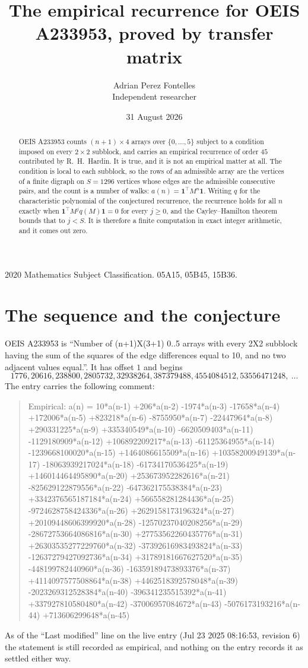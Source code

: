 \documentclass[11pt,a4paper]{article}
\title{The empirical recurrence for OEIS A233953, proved by transfer matrix}
\author{Adrian Perez Fontelles\\ \small Independent researcher}
\date{31 August 2026}
\theoremstyle{plain}
\theoremstyle{definition}
\begin{document}
\maketitle

\begin{abstract}
OEIS A233953 counts $(n+1)\times4$ arrays over $\{0,\dots,5\}$ subject to a condition imposed on
every $2\times2$ subblock, and carries an empirical recurrence of order $45$ contributed
by R.~H.~Hardin. It is true, and it is not an empirical matter at all. The condition is local
to each subblock, so the rows of an admissible array are the vertices of a finite digraph
on $S=1296$ vertices whose edges are the admissible consecutive pairs, and the count is a
number of walks: $a(n)=\mathbf{1}^{\!\top}M^{n}\mathbf{1}$. Writing $q$
for the characteristic polynomial of the conjectured recurrence, the recurrence holds for all
$n$ exactly when $\mathbf{1}^{\!\top}M^{j}q(M)\mathbf{1}=0$ for every $j\ge0$, and the
Cayley--Hamilton theorem bounds that to $j<S$. It is therefore a finite computation in exact
integer arithmetic, and it comes out zero.
\end{abstract}

\noindent\small 2020 Mathematics Subject Classification. 05A15, 05B45, 15B36.\normalsize

\section{The sequence and the conjecture}

OEIS A233953 is ``Number of (n+1)X(3+1) 0..5 arrays with every 2X2 subblock having the sum of the squares of the edge differences equal to 10, and no two adjacent values equal.''. It has offset $1$ and begins
\[
1776, 20616, 238800, 2805732, 32938264, 387379488, 4554084512, 53556471248,\ \dots
\]
The entry carries the following comment:
\begin{quote}\small
Empirical: a(n) = 10*a(n-1) +206*a(n-2) -1974*a(n-3) -17658*a(n-4) +172006*a(n-5) +823218*a(n-6) -8755950*a(n-7) -22447964*a(n-8) +290331225*a(n-9) +335340549*a(n-10) -6620509403*a(n-11) -1129180909*a(n-12) +106892209217*a(n-13) -61125364955*a(n-14) -1239668100020*a(n-15) +1464086615509*a(n-16) +10358200949139*a(n-17) -18063939217024*a(n-18) -61734170536425*a(n-19) +146014464495890*a(n-20) +253673952282616*a(n-21) -825629122879556*a(n-22) -647362175538384*a(n-23) +3342376565187184*a(n-24) +566558281284436*a(n-25) -9724628758424336*a(n-26) +2629158173196324*a(n-27) +20109448606399920*a(n-28) -12570237040208256*a(n-29) -28672753664086816*a(n-30) +27753562260435776*a(n-31) +26303535277229760*a(n-32) -37392616983493824*a(n-33) -12637279427092736*a(n-34) +31789181667627520*a(n-35) -448199782440960*a(n-36) -16359189473893376*a(n-37) +4114097577508864*a(n-38) +4462518392578048*a(n-39) -2023269312528384*a(n-40) -396341235515392*a(n-41) +337927810580480*a(n-42) -37006957084672*a(n-43) -5076173193216*a(n-44) +713606299648*a(n-45)
\end{quote}
As of the ``Last modified'' line on the live entry (Jul 23 2025 08:16:53, revision 6) the statement is
still recorded as empirical, and nothing on the entry records it as settled either way.
\end{document}
